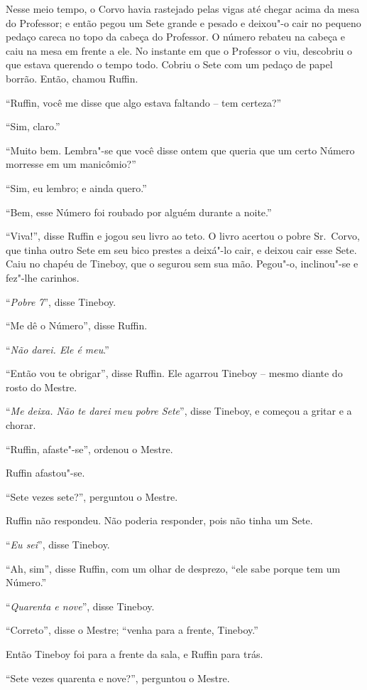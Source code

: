 Nesse meio tempo, o Corvo havia rastejado pelas vigas até chegar
acima da mesa do Professor; e então pegou um Sete grande e pesado e
deixou"-o cair no pequeno pedaço careca no topo da cabeça do Professor.
O número rebateu na cabeça e caiu na mesa em frente a ele. No instante em que
o Professor o viu, descobriu o que estava querendo o tempo todo.
Cobriu o Sete com um pedaço de papel borrão. Então, chamou Ruffin.

``Ruffin, você me disse que algo estava faltando -- tem certeza?''

``Sim, claro.''

``Muito bem. Lembra"-se que você disse ontem que queria que um certo
Número morresse em um manicômio?''

``Sim, eu lembro; e ainda quero.''

``Bem, esse Número foi roubado por alguém durante a noite.''

``Viva!'', disse Ruffin e jogou seu livro ao teto. O livro acertou o pobre
Sr.~Corvo, que tinha outro Sete em seu bico prestes a deixá"-lo cair, e
deixou cair esse Sete. Caiu no chapéu de Tineboy, que o segurou sem
sua mão. Pegou"-o, inclinou"-se e fez"-lhe carinhos.

``\emph{Pobre 7}'', disse Tineboy.

``Me dê o Número'', disse Ruffin.

``\emph{Não darei. Ele é meu}.''

``Então vou te obrigar'', disse Ruffin. Ele agarrou Tineboy -- mesmo diante
do rosto do Mestre.

``\emph{Me deixa. Não te darei meu pobre Sete}'', disse Tineboy, e
começou a gritar e a chorar.

``Ruffin, afaste"-se'', ordenou o Mestre.

Ruffin afastou"-se.

``Sete vezes sete?'', perguntou o Mestre.

Ruffin não respondeu. Não poderia responder, pois não tinha um Sete.

``\emph{Eu sei}'', disse Tineboy.

``Ah, sim'', disse Ruffin, com um olhar de desprezo, ``ele sabe porque
tem um Número.''

``\emph{Quarenta e nove}'', disse Tineboy.

``Correto'', disse o Mestre; ``venha para a frente, Tineboy.''

Então Tineboy foi para a frente da sala, e Ruffin para trás.

``Sete vezes quarenta e nove?'', perguntou o Mestre.


